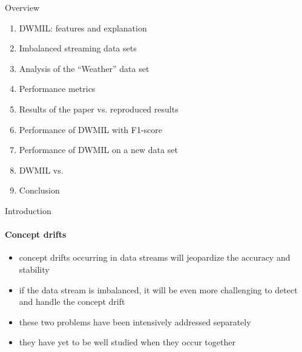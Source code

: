 
\begin{frame}{Overview}

\begin{enumerate}
    \item DWMIL: features and explanation
    \item Imbalanced streaming data sets
    \item Analysis of the \enquote{Weather} data set
    \item Performance metrics
    \item Results of the paper vs. reproduced results
    \item Performance of DWMIL with F1-score
    \item Performance of DWMIL on a new data set
    \item DWMIL vs. \lpn
    \item Conclusion
\end{enumerate}

\end{frame}


\begin{frame}{Introduction}
\framesubtitle{Concept drifts}

\begin{itemize}
    \item concept drifts occurring in data streams will jeopardize the accuracy and stability
    \item if the data stream is imbalanced, it will be even more challenging to detect and handle the concept drift
    \item these two problems have been intensively addressed separately
    \item they have yet to be well studied when they occur together
\end{itemize}

\end{frame}


